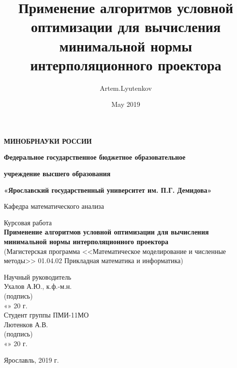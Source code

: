 \documentclass[12pt]{article} %
\title{Применение алгоритмов условной оптимизации для вычисления минимальной нормы интерполяционного проектора}
\author{Artem.Lyutenkov }
\date{May 2019}
\begin{document}
	\begin{titlepage} 
		 \begin{center}
			\large
			\textbf{МИНОБРНАУКИ РОССИИ}
			
			
			\vspace{0.5cm}
			
		\textbf{Федеральное государственное бюджетное образовательное}
		
		\textbf{учреждение высшего образования}
		
		\textbf{«Ярославский государственный университет им. П.Г. Демидова»}
			\vspace{0.25cm}
			
			
			Кафедра математического анализа
			\vfill
			
			Курсовая работа \\
			\textbf{Применение алгоритмов условной оптимизации для вычисления минимальной нормы интерполяционного проектора} \\
			(Магистерская программа <<Математическое моделирование и численные методы>> 01.04.02 Прикладная математика и информатика) 
			\vfill
			
			
			\bigskip
			
			
		\end{center}

\begin{flushright}
Научный руководитель\\
Ухалов А.Ю., к.ф.-м.н. \hspace{0.1cm}  \underline{\hspace{2cm}}\\
 \small(подпись)\\
 «\underline{\hspace{0.5cm}}» \underline{\hspace{1.5cm}} 20 \underline{\hspace{0.2cm}} г.\\
 Студент группы ПМИ-11МО\\
Лютенков А.В. \hspace{0.1cm}  \underline{\hspace{2cm}}\\
 \small(подпись)\\
 «\underline{\hspace{0.5cm}}» \underline{\hspace{1.5cm}} 20 \underline{\hspace{0.2cm}} г.\\
\end{flushright}
		\begin{center}
			Ярославль, 2019 г.
		\end{center}
\end{titlepage}
\tableofcontents \thispagestyle{empty}
\setcounter{page}{3}
\end{document}
